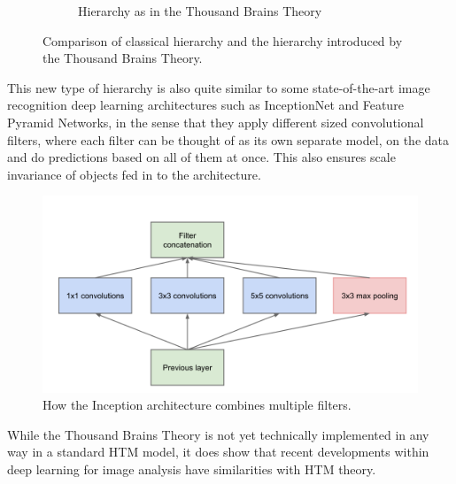 \begin{figure}[H]
\begin{subfigure}[t]{0.3\textwidth}
        \caption{Hierarchy as in the Thousand Brains Theory}
        \label{}
    \end{subfigure}
    \caption{Comparison of classical hierarchy and the hierarchy introduced by the Thousand Brains Theory.}
\end{figure}
This new type of hierarchy is also quite similar to some state-of-the-art image recognition deep learning architectures such as InceptionNet\cite{inceptionnet} and Feature Pyramid Networks\cite{fpn}, in the sense that they apply different sized convolutional filters, where each filter can be thought of as its own separate model, on the data and do predictions based on all of them at once. This also ensures scale invariance of objects fed in to the architecture.
\begin{figure}[H]
    \centering
    \includegraphics[width=\linewidth]{resources/models/inception_module.png}
    \caption{How the Inception \cite{inceptionnet} architecture combines multiple filters.}
    \label{fig:inception_module}
\end{figure}

While the Thousand Brains Theory is not yet technically implemented in any way in a standard HTM model, it does show that recent developments within deep learning for image analysis have similarities with HTM theory.

